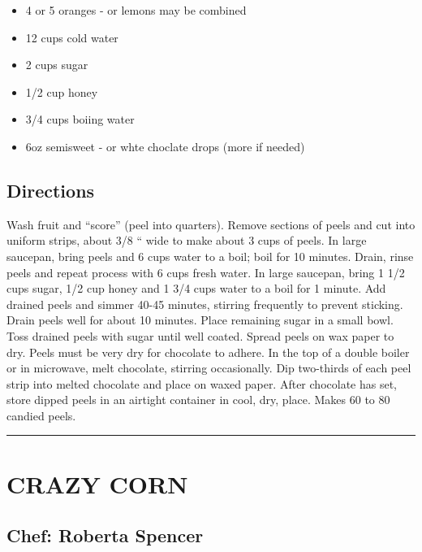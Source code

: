 \documentclass[
]{book}
\providecommand{\tightlist}{%
  \setlength{\itemsep}{0pt}\setlength{\parskip}{0pt}}
\begin{document}
\begin{itemize}
\tightlist
\item
  4 or 5 oranges - or lemons may be combined
\item
  12 cups cold water
\item
  2 cups sugar
\item
  1/2 cup honey
\item
  3/4 cups boiing water
\item
  6oz semisweet - or whte choclate drops (more if needed)
\end{itemize}

\hypertarget{directions-97}{%
\subsection*{Directions}\label{directions-97}}


Wash fruit and ``score'' (peel into quarters). Remove sections of peels and cut into uniform strips, about 3/8 `` wide to make about 3 cups of peels. In large saucepan, bring peels and 6 cups water to a boil; boil for 10 minutes. Drain, rinse peels and repeat process with 6 cups fresh water. In large saucepan, bring 1 1/2 cups sugar, 1/2 cup honey and 1 3/4 cups water to a boil for 1 minute. Add drained peels and simmer 40-45 minutes, stirring frequently to prevent sticking. Drain peels well for about 10 minutes. Place remaining sugar in a small bowl. Toss drained peels with sugar until well coated. Spread peels on wax paper to dry. Peels must be very dry for chocolate to adhere. In the top of a double boiler or in microwave, melt chocolate, stirring occasionally. Dip two-thirds of each peel strip into melted chocolate and place on waxed paper. After chocolate has set, store dipped peels in an airtight container in cool, dry, place. Makes 60 to 80 candied peels.

\begin{center}\rule{0.5\linewidth}{0.5pt}\end{center}

\hypertarget{crazy-corn}{%
\section*{CRAZY CORN}\label{crazy-corn}}


\hypertarget{chef-roberta-spencer-34}{%
\subsection*{Chef: Roberta Spencer}\label{chef-roberta-spencer-34}}
\end{document}
